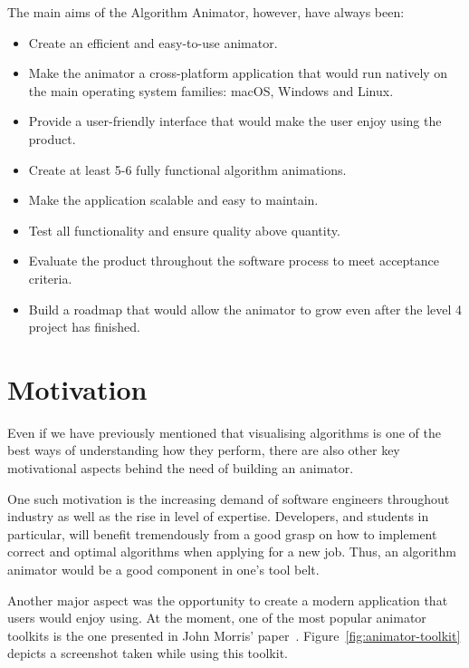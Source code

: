 \documentclass{l4proj}
\begin{document}
The main aims of the Algorithm Animator, however, have always been:
\begin{itemize}
	\item Create an efficient and easy-to-use animator.
	\item Make the animator a cross-platform application that would run natively on the main operating system families: macOS, Windows and Linux.
	\item Provide a user-friendly interface that would make the user enjoy using the product.
	\item Create at least 5-6 fully functional algorithm animations.
	\item Make the application scalable and easy to maintain.
	\item Test all functionality and ensure quality above quantity.
	\item Evaluate the product throughout the software process to meet acceptance criteria.
	\item Build a roadmap that would allow the animator to grow even after the level 4 project has finished.
\end{itemize}

\section{Motivation}

Even if we have previously mentioned that visualising algorithms is one of the best ways of understanding how they perform, there are also other key motivational aspects behind the need of building an animator.

One such motivation is the increasing demand of software engineers throughout industry as well as the rise in level of expertise. Developers, and students in particular, will benefit tremendously from a good grasp on how to implement correct and optimal algorithms when applying for a new job. Thus, an algorithm animator would be a good component in one's tool belt.

Another major aspect was the opportunity to create a modern application that users would enjoy using. At the
moment, one of the most popular animator toolkits is the one presented in John Morris' paper~\cite{animator-toolkit}.
Figure~\ref{fig:animator-toolkit} depicts a screenshot taken while using this toolkit. \newpage
\end{document}
